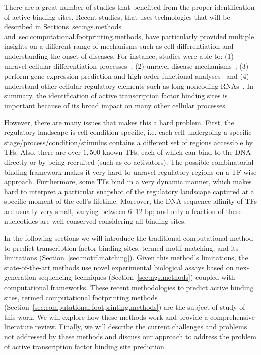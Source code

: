 There are a great number of studies that benefited from the proper identification of active binding sites. Recent studies, that uses technologies that will be described in Sections~{sec:ngs.methods} and~{sec:computational.footprinting.methods}, have particularly provided multiple insights on a different range of mechanisms such as cell differentiation and understanding the onset of diseases. For instance, studies were able to: (1) unravel cellular differentiation processes~\cite{lin2015,tsankov2015}; (2) unravel disease mechanisms~\cite{schaub2012,vernot2012,charos2012}; (3) perform gene expression prediction and high-order functional analyses~\cite{yip2012,whitfield2012,natarajan2012} and (4) understand other cellular regulatory elements such as long noncoding RNAs~\cite{tilgner2012,banfai2012}. In summary, the identification of active transcription factor binding sites is important because of its broad impact on many other cellular processes.

However, there are many issues that makes this a hard problem. First, the regulatory landscape is cell condition-specific, i.e. each cell undergoing a specific stage/process/condition/stimulus contains a different set of regions accessible by TFs. Also, there are over $1,500$ known TFs, each of which can bind to the DNA directly or by being recruited (such as co-activators). The possible combinatorial binding framework makes it very hard to unravel regulatory regions on a TF-wise approach. Furthermore, some TFs bind in a very dynamic manner, which makes hard to interpret a particular snapshot of the regulatory landscape captured at a specific moment of the cell's lifetime. Moreover, the DNA sequence affinity of TFs are usually very small, varying between 6--12 bp; and only a fraction of these nucleotides are well-conserved considering all binding sites.

In the following sections we will introduce the traditional computational method to predict transcription factor binding sites, termed motif matching, and its limitations (Section~\ref{sec:motif.matching}). Given this method's limitations, the state-of-the-art methods use novel experimental biological assays based on nex-generation sequencing techniques (Section~\ref{sec:ngs.methods}) coupled with computational frameworks. These recent methodologies to predict active binding sites, termed computational footprinting methods (Section~\ref{sec:computational.footprinting.methods}) are the subject of study of this work. We will explore how these methods work and provide a comprehensive literature review. Finally, we will describe the current challenges and problems not addressed by these methods and discuss our approach to address the problem of active transcription factor binding site prediction.

